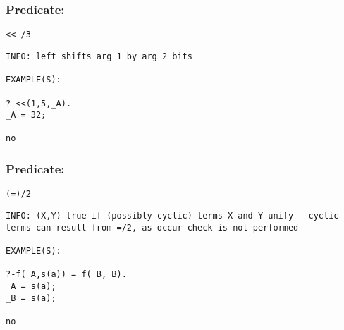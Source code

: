 \subsubsection{Predicate:} \label{V60WV60WV95W3}

\begin{verbatim}
<< /3
\end{verbatim}

{\small \begin{verbatim}
INFO: left shifts arg 1 by arg 2 bits

EXAMPLE(S):

?-<<(1,5,_A).
_A = 32;

no

\end{verbatim}}

\subsubsection{Predicate:} \label{V61WV95W2}

\begin{verbatim}
(=)/2
\end{verbatim}

{\small \begin{verbatim}
INFO: (X,Y) true if (possibly cyclic) terms X and Y unify - cyclic terms can result from =/2, as occur check is not performed

EXAMPLE(S):

?-f(_A,s(a)) = f(_B,_B).
_A = s(a);
_B = s(a);

no

\end{verbatim}}
